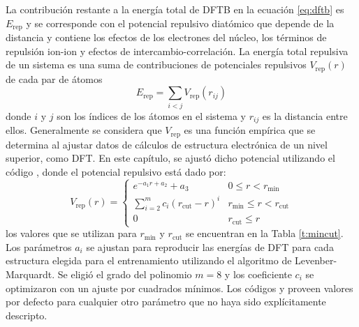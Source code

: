 La contribución restante a la energía total de DFTB en la ecuación \ref{eq:dftb}
es $E_{\text{rep}}$ y se corresponde con el potencial repulsivo diatómico que 
depende de la distancia y contiene los efectos de los electrones del núcleo, los 
términos de repulsión ion-ion y efectos de intercambio-correlación. 
La energía total repulsiva de un sistema es una suma de contribuciones de 
potenciales repulsivos $V_{\text{rep}}(r)$ de cada par de átomos
\begin{equation}\label{eq:rep}
    E_{\text{rep}}=\sum_{i<j} V_{\text{rep}}(r_{ij})
\end{equation}
donde $i$ y $j$ son los índices de los átomos en el sistema y $r_{ij}$ es la 
distancia entre ellos. Generalmente se considera que $V_{\text{rep}}$ es una
función empírica que se determina al ajustar datos de cálculos de estructura 
electrónica de un nivel superior, como DFT. En este capítulo, se ajustó dicho 
potencial utilizando el código  \cite{tango}, donde el potencial 
repulsivo está dado por:
\begin{equation}\label{eq:v_rep}
    V_{\text{rep}}(r) = \begin{cases}
        e^{-a_1r+a_2}+a_3 & 0\le r<r_{\min}\\
        \displaystyle\sum_{i=2}^m c_i\left(r_{\text{cut}}-r\right)^i & r_{\min}\le r < r_{\text{cut}}\\
        0 & r_{\text{cut}} \le r
    \end{cases}
\end{equation}
los valores que se utilizan para $r_{\min}$ y $r_{\text{cut}}$ se encuentran
en la Tabla \ref{t:mincut}. Los parámetros $a_i$ se ajustan para reproducir las 
energías de DFT para cada estructura elegida para el entrenamiento utilizando el 
algoritmo de Levenber-Marquardt. Se eligió el grado del polinomio $m = 8$ y 
los coeficiente $c_i$ se optimizaron con un ajuste por cuadrados mínimos.
Los códigos  y  proveen valores por defecto para 
cualquier otro parámetro que no haya sido explícitamente descripto. 
\begin{table}[h!]
    \centering
    \caption{Valores de $r_{\min}$ y $r_{\text{cut}}$ utilizados en la ecuación
    \ref{eq:v_rep}}
    \setlength\extrarowheight{2pt}
    \label{t:mincut}
\end{table}


